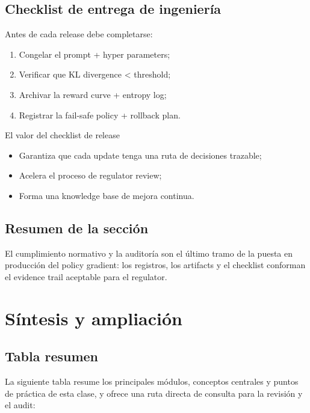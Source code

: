 \documentclass[a4paper]{article}
\begin{document}
\subsection{Checklist de entrega de ingeniería}
Antes de cada release debe completarse:
\begin{enumerate}
    \item Congelar el prompt + hyper parameters;
    \item Verificar que KL divergence < threshold;
    \item Archivar la reward curve + entropy log;
    \item Registrar la fail-safe policy + rollback plan.
\end{enumerate}

\begin{importantbox}{El valor del checklist de release}
\begin{itemize}
    \item Garantiza que cada update tenga una ruta de decisiones trazable;
    \item Acelera el proceso de regulator review;
    \item Forma una knowledge base de mejora continua.
\end{itemize}
\end{importantbox}

\subsection{Resumen de la sección}
El cumplimiento normativo y la auditoría son el último tramo de la puesta en producción del policy gradient: los registros, los artifacts y el checklist conforman el evidence trail aceptable para el regulator.
\section{Síntesis y ampliación}

\subsection{Tabla resumen}
La siguiente tabla resume los principales módulos, conceptos centrales y puntos de práctica de esta clase, y ofrece una ruta directa de consulta para la revisión y el audit:
\end{document}
